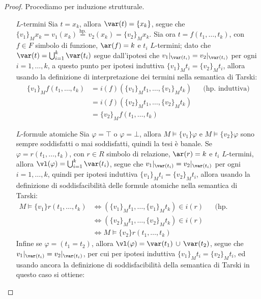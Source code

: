 \begin{proof}
    Procediamo per induzione strutturale.
    \begin{itemize}
        \item [$\boxed{\text{$L$-termini}}$] Sia $t = x_k$, allora $\var(t) = \{x_k\}$, segue che $\{v_1\}_M x_k = v_1(x_k) \overset{\text{hp.}}{=} v_2(x_k) = \{v_2\}_M x_k$. Sia ora $t = f(t_1,\ldots,t_k)$, con $f \in F$ simbolo di funzione, $\ar(f) = k$ e $t_i$ $L$-termini;
        dato che $\var(t) = \bigcup_{i = 1}^k \var(t_i)$ segue dall'ipotesi che $v_1|_{\var(t_i)} = v_2|_{\var(t_i)}$ per ogni $i = 1,\ldots,k$, a questo punto per ipotesi induttiva $\{v_1\}_M t_i = \{v_2\}_M t_i$, allora usando la definizione di interpretazione dei termini nella semantica di Tarski:
        \begin{align*}
            \{v_1\}_M f(t_1,\ldots,t_k) &= i(f)(\{v_1\}_M t_1,\ldots,\{v_1\}_M t_k) &&\text{(hp. induttiva)}\\
            &= i(f)(\{v_2\}_M t_1,\ldots,\{v_2\}_M t_k) \\
            &= \{v_2\}_M f(t_1,\ldots,t_k)
        \end{align*}
        \item [$\boxed{\text{$L$-formule atomiche}}$] Sia $\varphi = \top$ o $\varphi = \bot$, allora $M \models \{v_1\} \varphi$ e $M \models \{v_2\} \varphi$ sono sempre soddisfatti o mai soddisfatti, quindi la tesi è banale.
        Se $\varphi = r(t_1,\ldots,t_k)$, con $r \in R$ simbolo di relazione, $\ar(r) = k$ e $t_i$ $L$-termini, allora $\vl(\varphi) = \bigcup_{i = 1}^k \var(t_i)$, segue che $v_1|_{\var(t_i)} = v_2|_{\var(t_i)}$ per ogni $i = 1,\ldots,k$, quindi per ipotesi induttiva $\{v_1\}_M t_i = \{v_2\}_M t_i$,
        allora usando la definizione di soddisfacibilità delle formule atomiche nella semantica di Tarski:
        \begin{align*}
            M \models \{v_1\} r(t_1,\ldots,t_k) &\iff (\{v_1\}_M t_1,\ldots,\{v_1\}_M t_k) \in i(r) &&\text{(hp. induttiva)} \\
            &\iff (\{v_2\}_M t_1,\ldots,\{v_2\}_M t_k) \in i(r) \\
            &\iff M \models \{v_2\} r(t_1,\ldots,t_k)
        \end{align*}
        Infine se $\varphi = (t_1 = t_2)$, allora $\vl(\varphi) = \var(t_1) \,\cup\, \var(t_2)$, segue che $v_1|_{\var(t_i)} = v_2|_{\var(t_i)}$, per cui per ipotesi induttiva $\{v_1\}_M t_i = \{v_2\}_M t_i$, ed usando ancora la definizione di soddisfacibilità della semantica di Tarski in questo caso si ottiene:

\end{itemize}
\end{proof}
